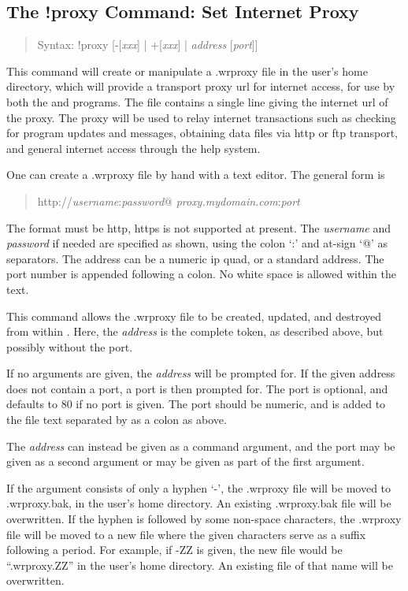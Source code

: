 \subsection{The {\cb !proxy} Command: Set Internet Proxy}
\begin{quote}
Syntax: {\vt !proxy} [{\vt -}[{\it xxx\/}] {\vt |} {\vt +}[{\it xxx\/}] {\vt |}
 {\it address} [{\it port}]]
\end{quote}
This command will create or manipulate a {\vt .wrproxy} file in the
user's home directory, which will provide a transport proxy url for
internet access, for use by both the {\Xic} and {\WRspice} programs. 
The file contains a single line giving the internet url of the proxy. 
The proxy will be used to relay internet transactions such as checking
for program updates and messages, obtaining data files via http or ftp
transport, and general internet access through the help system.

One can create a {\vt .wrproxy} file by hand with a text editor.  The
general form is
\begin{quote}
{\vt http://}{\it username\/}{\vt :}{\it password\/}{\vt @}{\it
 proxy.mydomain.com\/}{\vt :}{\it port}
\end{quote}
The format must be {\vt http}, {\vt https} is not supported at
present.  The {\it username} and {\it password} if needed are
specified as shown, using the colon `{\vt :}' and at-sign `{\vt @}' as
separators.  The address can be a numeric ip quad, or a standard
address.  The port number is appended following a colon.  No white
space is allowed within the text.

This command allows the {\vt .wrproxy} file to be created, updated,
and destroyed from within {\Xic}.  Here, the {\it address} is the
complete token, as described above, but possibly without the port.

If no arguments are given, the {\it address} will be prompted for.  If
the given address does not contain a port, a port is then prompted
for.  The port is optional, and defaults to 80 if no port is given. 
The port should be numeric, and is added to the file text separated by
as a colon as above.

The {\it address} can instead be given as a command argument, and the
port may be given as a second argument or may be given as part of the
first argument.

If the argument consists of only a hyphen `{\vt -}', the {\vt
.wrproxy} file will be moved to {\vt .wrproxy.bak}, in the user's home
directory.  An existing {\vt .wrproxy.bak} file will be overwritten. 
If the hyphen is followed by some non-space characters, the {\vt
.wrproxy} file will be moved to a new file where the given characters
serve as a suffix following a period.  For example, if {\vt -ZZ} is
given, the new file would be ``{\vt .wrproxy.ZZ}'' in the user's home
directory.  An existing file of that name will be overwritten.


